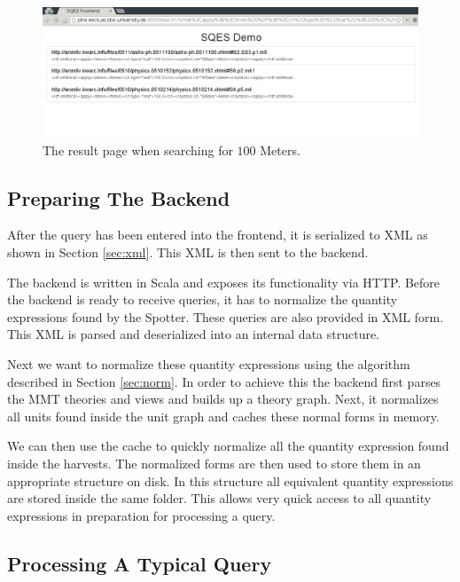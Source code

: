 \begin{figure}
  \begin{center}
    \includegraphics[width=\textwidth]{img/res1.png}
  \end{center}
  \caption{The result page when searching for $100$ Meters. }
  \label{fig:frontres}
\end{figure}

\subsection{Preparing The Backend}

After the query has been entered into the frontend, it is serialized to XML as shown in Section \ref{sec:xml}. This XML is then sent to the backend.

The backend is written in Scala and exposes its functionality via HTTP. Before the backend is ready to receive queries, it has to normalize the quantity expressions found by the Spotter. These queries are also provided in XML form. This XML is parsed and deserialized into an internal data structure.

Next we want to normalize these quantity expressions using the algorithm described in Section \ref{sec:norm}. In order to achieve this the backend first parses the MMT theories and views and builds up a theory graph. Next, it normalizes all units found inside the unit graph and caches these normal forms in memory.

We can then use the cache to quickly normalize all the quantity expression found inside the harvests. The normalized forms are then used to store them in an appropriate structure on disk. In this structure all equivalent quantity expressions are stored inside the same folder. This allows very quick access to all quantity expressions in preparation for processing a query.

\subsection{Processing A Typical Query}


